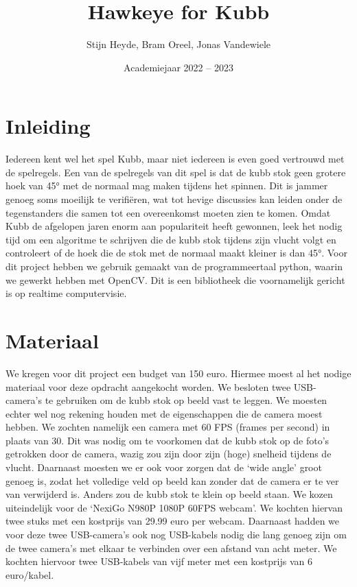 \documentclass[kulak]{kulakarticle} %
\title{Hawkeye for Kubb}
\author{Stijn Heyde, Bram Oreel, Jonas Vandewiele}
\date{Academiejaar 2022 -- 2023}
\begin{document}
	\maketitle

	\section*{Inleiding}

	Iedereen kent wel het spel Kubb, maar niet iedereen is even goed vertrouwd met de spelregels. Een van de spelregels van dit spel is dat de kubb stok geen grotere hoek van 45° met de normaal mag maken tijdens het spinnen. Dit is jammer genoeg soms moeilijk te verifiëren, wat tot hevige discussies kan leiden onder de tegenstanders die samen tot een overeenkomst moeten zien te komen. Omdat Kubb de afgelopen jaren enorm aan populariteit heeft gewonnen, leek het nodig tijd om een algoritme te schrijven die de kubb stok tijdens zijn vlucht volgt en controleert of de hoek die de stok met de normaal maakt kleiner is dan 45°. Voor dit project hebben we gebruik gemaakt van de programmeertaal python, waarin we gewerkt hebben met OpenCV. Dit is een bibliotheek die voornamelijk gericht is op realtime computervisie.

	\section{Materiaal}

	We kregen voor dit project een budget van 150 euro. Hiermee moest al het nodige materiaal voor deze opdracht aangekocht worden. We besloten twee USB-camera’s te gebruiken om de kubb stok op beeld vast te leggen. We moesten echter wel nog rekening houden met de eigenschappen die de camera moest hebben. We zochten namelijk een camera met 60 FPS (frames per second) in plaats van 30. Dit was nodig om te voorkomen dat de kubb stok op de foto’s getrokken door de camera, wazig zou zijn door zijn (hoge) snelheid tijdens de vlucht. Daarnaast moesten we er ook voor zorgen dat de ‘wide angle’ groot genoeg is, zodat het volledige veld op beeld kan zonder dat de camera er te ver van verwijderd is. Anders zou de kubb stok te klein op beeld staan. We kozen uiteindelijk voor de ‘NexiGo N980P 1080P 60FPS webcam’. We kochten hiervan twee stuks met een kostprijs van 29.99 euro per webcam. Daarnaast hadden we voor deze twee USB-camera’s ook nog USB-kabels nodig die lang genoeg zijn om de twee camera’s met elkaar te verbinden over een afstand van acht meter. We kochten hiervoor twee USB-kabels van vijf meter met een kostprijs van 6 euro/kabel.
\end{document}
